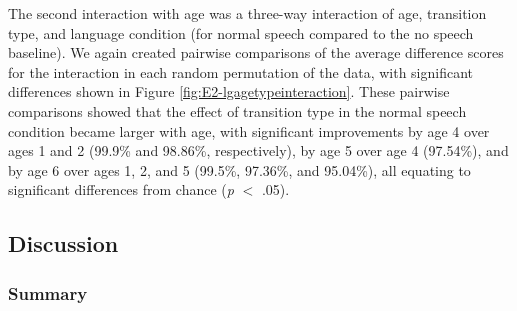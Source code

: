 \documentclass[authoryear, 12pt]{elsarticle}
\begin{document}
The second interaction with age was a three-way interaction of age, transition type, and language condition (for normal speech compared to the no speech baseline). We again created pairwise comparisons of the average difference scores for the interaction in each random permutation of the data, with significant differences shown in Figure \ref{fig:E2-lgagetypeinteraction}. These pairwise comparisons showed that the effect of transition type in the normal speech condition became larger with age, with significant improvements by age 4 over ages 1 and 2 (99.9\% and 98.86\%, respectively), by age 5 over age 4 (97.54\%), and by age 6 over ages 1, 2, and 5 (99.5\%, 97.36\%, and 95.04\%), all equating to significant differences from chance (\textit{p} $<$ .05).

\subsection{Discussion}
\label{sec:discussion2}


\subsubsection{Summary}
\label{sec:summary2}
\end{document}
